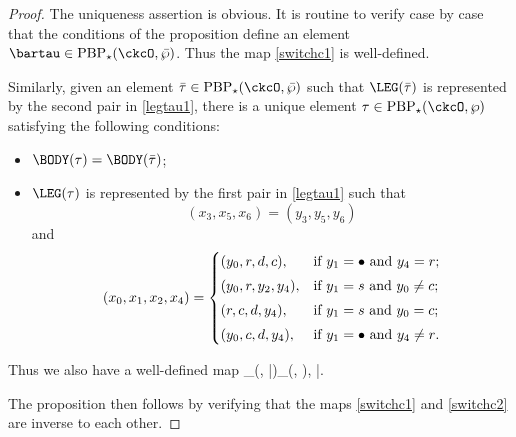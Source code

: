 \documentclass[ssunip]{subfiles}
\begin{document}
\begin{proof}
The uniqueness assertion is obvious. It is routine to verify case by case  that the conditions  of the proposition define an element $\bartau\in \mathrm{PBP}_\star(\ckcO,\bar \wp ) $. Thus the map \eqref{switchc1} is well-defined. 

Similarly, given an element $\bar \tau\in \mathrm{PBP}_\star(\ckcO,\bar \wp)$ such that  $\LEG(\bar \tau)$ is represented by the second pair in 
\eqref{legtau1}, there is a unique element $\tau\in  \mathrm{PBP}_\star(\ckcO,\wp) $ satisfying the following conditions: 
\begin{itemize}
    \item $\BODY(\tau) = \BODY(\bar \tau)$;
    \item $\LEG(\tau)$ is represented by the first pair in 
\eqref{legtau1} such that 
\[
(x_3,x_5,x_6)=(y_3,y_5,y_6)
\]
and
\[
  (x_0,x_1, x_2, x_4)=\begin{cases}
   (y_0, r,d,c),
  & \textrm{if $y_1=\bullet$ and $y_4=r$}; \smallskip \\
  (y_0, r,y_2, y_4),
  & \textrm{if $y_1=s$ and $y_0\neq c$}; \smallskip \\
   (r, c, d, y_4),
  & \textrm{if $y_1=s$ and $y_0= c$}; \smallskip \\
   (y_0, c,d, y_4),
  & \textrm{if $y_1=\bullet$ and $y_4\neq r$}. \\
  \end{cases}
\]
\end{itemize}
Thus we also have a well-defined map
\be\label{switchc2}
 _\star(\ckcO, \bar \wp)\rightarrow {}_\star(\ckcO, \wp), \qquad
 \bar \tau \mapsto \tau.
 \ee

The proposition then follows by verifying that the maps \eqref{switchc1} and \eqref{switchc2} are inverse to each other. 

  
\end{proof}
\end{document}
